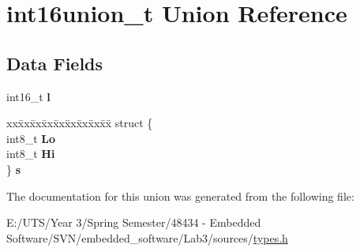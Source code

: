 \hypertarget{unionint16union__t}{}\section{int16union\+\_\+t Union Reference}
\label{unionint16union__t}
\subsection*{Data Fields}
\begin{DoxyCompactItemize}
\item 
\hypertarget{unionint16union__t_ad8a9524a204892ae3d42a2d251ea0643}{}int16\+\_\+t {\bfseries l}\label{unionint16union__t_ad8a9524a204892ae3d42a2d251ea0643}

\item 
\hypertarget{unionint16union__t_a173c74e7b1c0895ad2915e4d76d34b5b}{}\begin{tabbing}
xx\=xx\=xx\=xx\=xx\=xx\=xx\=xx\=xx\=\kill
struct \{\\
\>int8\_t {\bfseries Lo}\\
\>int8\_t {\bfseries Hi}\\
\} {\bfseries s}\label{unionint16union__t_a173c74e7b1c0895ad2915e4d76d34b5b}
\\

\end{tabbing}\end{DoxyCompactItemize}


The documentation for this union was generated from the following file\+:\begin{DoxyCompactItemize}
\item 
E\+:/\+U\+T\+S/\+Year 3/\+Spring Semester/48434 -\/ Embedded Software/\+S\+V\+N/embedded\+\_\+software/\+Lab3/sources/\hyperlink{types_8h}{types.\+h}\end{DoxyCompactItemize}
